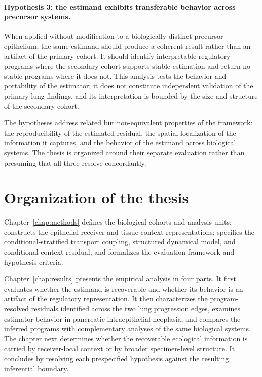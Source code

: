\paragraph{Hypothesis 3: the estimand exhibits transferable behavior across
precursor systems.}
When applied without modification to a biologically distinct precursor
epithelium, the same estimand should produce a coherent result rather than an
artifact of the primary cohort. It should identify interpretable regulatory
programs where the secondary cohort supports stable estimation and return no
stable programs where it does not. This analysis tests the behavior and
portability of the estimator; it does not constitute independent validation
of the primary lung findings, and its interpretation is bounded by the size
and structure of the secondary cohort.

The hypotheses address related but non-equivalent properties of the
framework: the reproducibility of the estimated residual, the spatial
localization of the information it captures, and the behavior of the
estimand across biological systems. The thesis is organized around their
separate evaluation rather than presuming that all three resolve
concordantly.

\section{Organization of the thesis}
\label{sec:intro-organization}

Chapter~\ref{chap:methods} defines the biological cohorts and analysis units;
constructs the epithelial receiver and tissue-context representations;
specifies the conditional-stratified transport coupling, structured dynamical
model, and conditional context residual; and formalizes the evaluation
framework and hypothesis criteria.

Chapter~\ref{chap:results} presents the empirical analysis in four parts. It
first evaluates whether the estimand is recoverable and whether its behavior
is an artifact of the regulatory representation. It then characterizes the
program-resolved residuals identified across the two lung progression edges,
examines estimator behavior in pancreatic intraepithelial neoplasia, and
compares the inferred programs with complementary analyses of the same
biological systems. The chapter next determines whether the recoverable
ecological information is carried by receiver-local context or by broader
specimen-level structure. It concludes by resolving each prespecified
hypothesis against the resulting inferential boundary.

